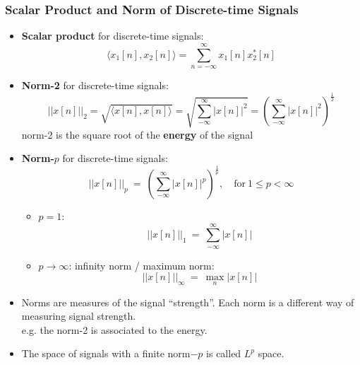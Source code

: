  \subsubsection{Scalar Product and Norm of Discrete-time Signals}
 \begin{itemize}
 \item \textbf{Scalar product} for discrete-time signals:
  \[ \langle x_{1}[n], x_{2}[n] \rangle = \sum_{n=-\infty}^{\infty} x_{1}[n] x_{2}^{*}[n] \]
 \item \textbf{Norm-2} for discrete-time signals:
  \[ \lvert \lvert x[n] \rvert \rvert_{2} = \sqrt{\langle x[n], x[n] \rangle} = \sqrt{\sum_{-\infty}^{\infty}\lvert
  x[n] \rvert^{2}} = \left( \sum_{-\infty}^{\infty} \lvert x[n] \rvert^{2} \right) ^{\frac{1}{2}} \]
  norm-2 is the square root of the \textbf{energy} of the signal
 \item \textbf{Norm-$p$} for discrete-time signals:
   \[ \lvert \lvert x[n] \rvert \rvert_{p} \ = \  \left( \sum_{-\infty}^{\infty} \lvert x[n] \rvert^{p} \right)
    ^{\frac{1}{p}}, \quad \text{for} \ 1 \leq p < \infty \]
    \begin{itemize}
     \item $p=1$: \[ \lvert \lvert x[n] \rvert \rvert_{1} \ = \ \sum_{-\infty}^{\infty} \lvert x[n] \rvert \]
     \item $p \to \infty$: infinity norm / maximum norm:\[ \lvert \lvert x[n] \rvert \rvert_{\infty} \ = \ 
      \max_{n} \lvert x[n] \rvert \] 
    \end{itemize}    
    \item Norms are measures of the signal “strength”. Each norm is a different way of measuring signal strength.\\
     e.g. the norm-2 is associated to the energy.
  \item The space of signals with a finite norm$-p$ is called $L^{p}$ space.
 \end{itemize}
 
 
